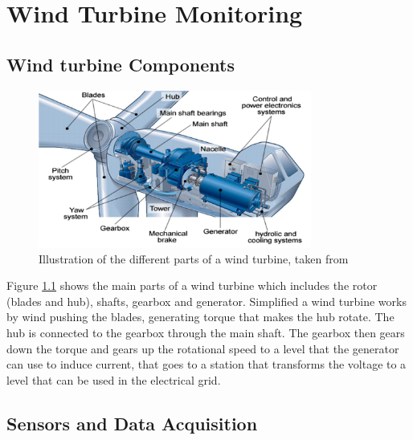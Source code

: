 \chapter{Wind Turbine Monitoring} \label{s:wt_monitoring}

\section{Wind turbine Components}
\begin{figure}[h]
    \begin{center}
    \includegraphics[width=0.8\textwidth]{wind_turbine/wt_parts.png}
    \end{center}
    \caption{Illustration of the different parts of a wind turbine, taken from \cite{adv_meth_for_wt_cond_monit_rev}}
    \label{fig:wt_parts}
\end{figure}

Figure \ref{fig:wt_parts} shows the main parts of a wind turbine which includes the rotor (blades and hub), shafts, gearbox and generator. Simplified a wind turbine works by wind pushing the blades, generating torque that makes the hub rotate. The hub is connected to the gearbox through the main shaft. The gearbox then gears down the torque and gears up the rotational speed to a level that the generator can use to induce current, that goes to a station that transforms the voltage to a level that can be used in the electrical grid. 

\section{Sensors and Data Acquisition}

